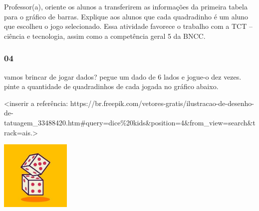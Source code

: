 Professor(a), oriente os alunos a transferirem as informações da
primeira tabela para o gráfico de barras. Explique aos alunos que cada
quadradinho é um aluno que escolheu o jogo selecionado. Essa atividade
favorece o trabalho com a TCT -- ciência e tecnologia, assim como a
competência geral 5 da BNCC.

\subsubsection{04}\label{section-79}

vamos brincar de jogar dados? pegue um dado de 6 lados e jogue-o dez
vezes. pinte a quantidade de quadradinhos de cada jogada no gráfico
abaixo.

\textless{}inserir a referência:
https://br.freepik.com/vetores-gratis/ilustracao-de-desenho-de-tatuagem\_33488420.htm\#query=dice\%20kids\&position=4\&from\_view=search\&track=ais.\textgreater{}

\includegraphics[width=1.31250in,height=1.31250in]{media/image97.jpg}


